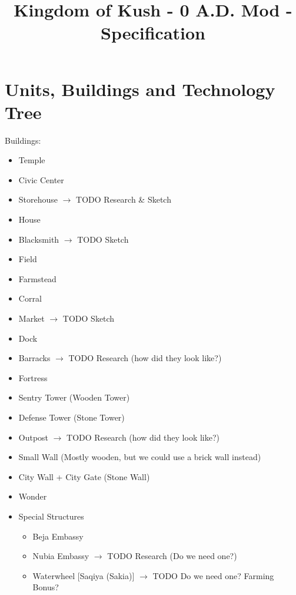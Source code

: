 \documentclass[a4paper,12pt]{scrreprt}
\title{Kingdom of Kush - 0 A.D. Mod - Specification}
\begin{document}
\maketitle


\tableofcontents

\chapter{Units, Buildings and Technology Tree}

Buildings:

\begin{itemize}
	\item Temple
	\item Civic Center
	\item Storehouse $\rightarrow$ TODO Research \& Sketch
	\item House
	\item Blacksmith $\rightarrow$ TODO Sketch
	\item Field
	\item Farmstead
	\item Corral
	\item Market $\rightarrow$ TODO Sketch
	\item Dock
	\item Barracks $\rightarrow$ TODO Research (how did they look like?)
	\item Fortress
	\item Sentry Tower (Wooden Tower)
	\item Defense Tower (Stone Tower)
	\item Outpost $\rightarrow$ TODO Research (how did they look like?)
	\item Small Wall (Mostly wooden, but we could use a brick wall instead)
	\item City Wall + City Gate (Stone Wall)
	\item Wonder
	\item Special Structures
	\begin{itemize}
		\item Beja Embassy  
		
		\item Nubia Embassy $\rightarrow$ TODO Research (Do we need one?)
		\item Waterwheel [Saqiya (Sakia)] $\rightarrow$ TODO Do we need one? Farming Bonus?
	\end{itemize}
\end{itemize}
\end{document}
